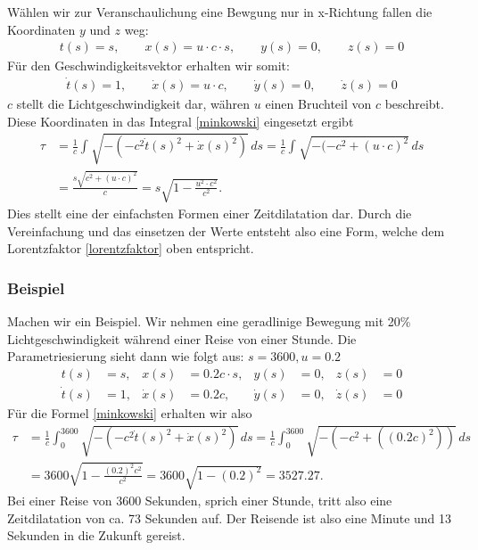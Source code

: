 \begin{refsection}
Wählen wir zur Veranschaulichung eine Bewgung nur in x-Richtung fallen die Koordinaten $y$ und $z$ weg:
\begin{align*}
     t(s)= s,
 	 \qquad x(s)=u\cdot c \cdot s,
     \qquad y(s)=0,
     \qquad z(s)=0 
\end{align*}
Für den Geschwindigkeitsvektor erhalten wir somit:
\begin{align*}
     \dot{t}(s)=1,
     \qquad\dot{x}(s)=u\cdot c,
     \qquad\dot{y}(s)=0,
     \qquad\dot{z}(s)=0
\end{align*}
$c$ stellt die Lichtgeschwindigkeit dar, währen $u$ einen Bruchteil von $c$ beschreibt.
Diese Koordinaten in das Integral \ref{minkowski} eingesetzt ergibt
\begin{align*}
\tau
&=
\frac{1}{c}\int_{}^{}\sqrt{-(-c^2\dot{t}(s)^2+\dot{x}(s)^2)}\,ds 
=
\frac{1}{c}\int_{}^{}\sqrt{-(-c^2 +(u\cdot c)^{2}}\,ds\\
&=
\frac{s\sqrt{c^2+(u\cdot c)^{2}}}{c} 
=
s\sqrt{1-\frac{u^2\cdot c^2}{c^2}}.
\end{align*}
Dies stellt eine der einfachsten Formen einer Zeitdilatation dar. Durch die Vereinfachung und das einsetzen der Werte entsteht also eine Form, welche dem Lorentzfaktor \eqref{lorentzfaktor} oben entspricht.

\subsubsection{Beispiel}
Machen wir ein Beispiel. Wir nehmen eine geradlinige Bewegung mit 20\% Lichtgeschwindigkeit während einer Reise von einer Stunde. Die Parametriesierung sieht dann wie folgt aus:
$s=3600, u=0.2$ 
\[
\begin{aligned}
t(s)&=s, & x(s)&=0.2c \cdot s, & y(s)&=0, & z(s)&=0 \\
\dot{t}(s)&=1, & \dot{x}(s)&=0.2c, & \dot{y}(s)&=0, & \dot{z}(s)&=0
\end{aligned}
\]
Für die Formel \eqref{minkowski}  erhalten wir also
\begin{align*}
 \tau
&=
\frac{1}{c}\int_{0}^{3600}\sqrt{-(-c^2\dot{t}(s)^2+\dot{x}(s)^2)}\,ds
=
\frac{1}{c}\int_{0}^{3600}\sqrt{-(-c^2+((0.2c)^2))}\,ds\\
&=
3600\sqrt{1-\frac{(0.2)^2 c^2}{c^2}} 
=
3600\sqrt{1-(0.2)^2}
=
3527.27.
\end{align*}
Bei einer Reise von 3600 Sekunden, sprich einer Stunde, tritt also eine Zeitdilatation von ca. 73 Sekunden auf. Der Reisende ist also eine Minute und 13 Sekunden in die Zukunft gereist.


\end{refsection}
